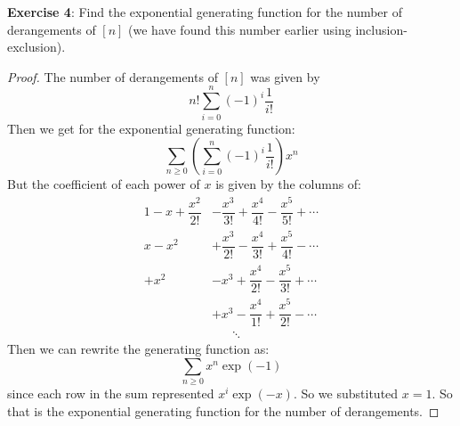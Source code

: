 \documentclass{article}
\begin{document}
\textbf{Exercise 4}: Find the exponential generating function for the number of derangements of $[n]$ (we have found this number earlier using inclusion-exclusion).
    \begin{proof}
        The number of derangements of $[n]$ was given by 
            \begin{equation*}
                n!\sum_{i = 0}^{n}(-1)^{i}\dfrac{1}{i!}
            \end{equation*}
        Then we get for the exponential generating function:
            \begin{equation*}
                \sum_{n \geq 0} \left(\sum_{i = 0}^{n} (-1)^{i}\dfrac{1}{i!}\right)x^{n}
            \end{equation*}
        But the coefficient of each power of $x$ is given by the columns of:
            \begin{align*}
                1 - x + \dfrac{x^{2}}{2!} &-          \dfrac{x^{3}}{3!} + \dfrac{x^{4}}{4!} - \dfrac{x^{5}}{5!} + \cdots \\
                 x - x^{2}                &+          \dfrac{x^{3}}{2!} - \dfrac{x^{4}}{3!} + \dfrac{x^{5}}{4!} - \cdots \\
                +x^{2}                    &-          x^{3} + \dfrac{x^{4}}{2!} - \dfrac{x^{5}}{3!} + \cdots             \\
                                          &+          x^{3} - \dfrac{x^{4}}{1!} + \dfrac{x^{5}}{2!} - \cdots             \\
                                          &     \hspace{20pt} \ddots                                                              
            \end{align*}
        Then we can rewrite the generating function as:
            \begin{equation*}
                \sum_{n \geq 0} x^{n}\exp(-1)
            \end{equation*}
        since each row in the sum represented $x^{i}\exp(-x)$. So we substituted $x = 1$. So that is the exponential generating function for the number of derangements.
    \end{proof}
\end{document}
